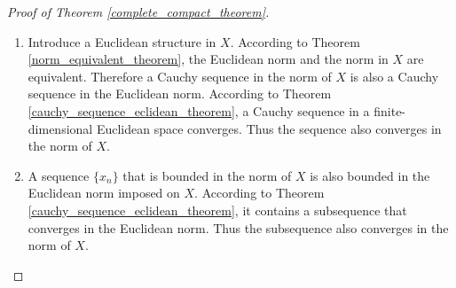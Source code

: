 \documentclass[11pt]{book}
\theoremstyle{definition}
\numberwithin{equation}{chapter}
\begin{document}
\medskip

\begin{proof}[Proof of Theorem \ref{complete_compact_theorem}]
~\begin{enumerate}[label=(\alph*)]
    \item Introduce a Euclidean structure in $X$. According to Theorem \ref{norm_equivalent_theorem}, the Euclidean norm and the norm in $X$ are equivalent. Therefore a Cauchy sequence in the norm of $X$ is also a Cauchy sequence in the Euclidean norm.  According to Theorem \ref{cauchy_sequence_eclidean_theorem}, a Cauchy sequence in a finite-dimensional Euclidean space converges. Thus the sequence also converges in the norm of $X$.
    
    \item A sequence $\{x_n\}$ that is bounded in the norm of $X$ is also bounded in the Euclidean norm imposed on $X$. According to Theorem \ref{cauchy_sequence_eclidean_theorem}, it contains a subsequence that converges in the Euclidean norm. Thus the subsequence also converges in the norm of $X$.
\end{enumerate}
\end{proof}

\medskip
\end{document}
